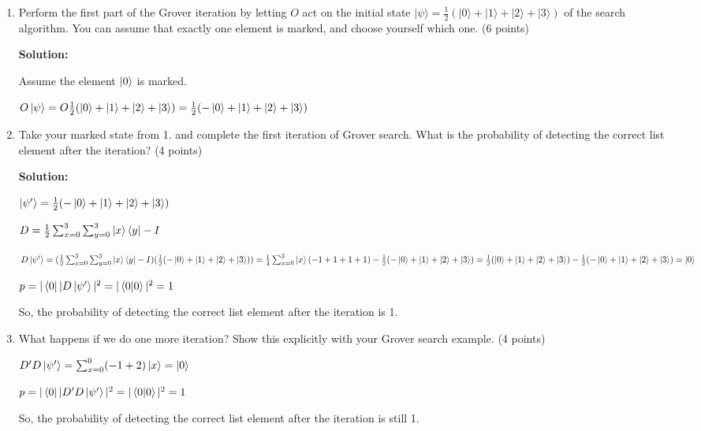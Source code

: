 \documentclass[12pt]{article}
\begin{document}
\begin{enumerate}[start=4]
    \item Perform the first part of the Grover iteration by letting $O$ act on the initial state $|\psi\rangle = \frac{1}{2}(|0\rangle + |1\rangle + |2\rangle + |3\rangle)$ of the search algorithm. You can assume that exactly one element is marked, and choose yourself which one. (6 points)

          \textbf{Solution:}

          Assume the element $\ket{0}$ is marked.

          $O\ket{\psi} = O\frac{1}{2}(\ket{0}+\ket{1}+\ket{2}+\ket{3}) = \frac{1}{2}(-\ket{0}+\ket{1}+\ket{2}+\ket{3})$

    \item  Take your marked state from 1. and complete the first iteration of Grover search. What is the probability of detecting the correct list element after the iteration? (4 points)

          \textbf{Solution:}


          $\ket{\psi'} = \frac{1}{2}(-\ket{0}+\ket{1}+\ket{2}+\ket{3})$

          $D = \frac{1}{2}\sum_{x=0}^{3}\sum_{y=0}^{3}\ket{x}\bra{y}-I$


          $D\ket{\psi'} = (\frac{1}{2}\sum_{x=0}^{3}\sum_{y=0}^{3}\ket{x}\bra{y}-I)(\frac{1}{2}(-\ket{0}+\ket{1}+\ket{2}+\ket{3}))
              \\=\frac{1}{4}\sum_{x=0}^3\ket{x}(-1+1+1+1)-\frac{1}{2}(-\ket{0}+\ket{1}+\ket{2}+\ket{3})
              \\=\frac{1}{2}(\ket{0}+\ket{1}+\ket{2}+\ket{3})-\frac{1}{2}(-\ket{0}+\ket{1}+\ket{2}+\ket{3})
              \\=\ket{0}
          $


          $p = |\bra{0}|D\ket{\psi'}|^2 = |\braket{0|0}|^2 =1$

          So, the probability of detecting the correct list element after the iteration is 1.

    \item What happens if we do one more iteration? Show this explicitly with your Grover search example. (4 points)

          $D'D\ket{\psi'} = \sum_{x=0}^{0}(-1+2)\ket{x} = \ket{0}$


          $p = |\bra{0}|D'D\ket{\psi'}|^2 = |\braket{0|0}|^2 =1$

          So, the probability of detecting the correct list element after the iteration is still 1.

\end{enumerate}
\end{document}
